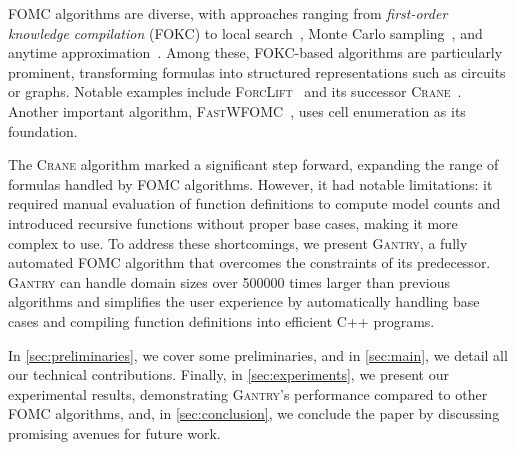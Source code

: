 \documentclass[a4paper,UKenglish,cleveref, autoref, thm-restate]{lipics-v2021}
\newcommand{\Cranetwo}{\textsc{Gantry}}
\begin{document}

FOMC algorithms are diverse, with approaches ranging from \emph{first-order
  knowledge compilation} (FOKC) to local
search~\cite{DBLP:journals/pvldb/NiuRDS11}, Monte Carlo
sampling~\cite{DBLP:journals/cacm/GogateD16}, and anytime
approximation~\cite{DBLP:conf/ijcai/BremenK20}. Among these, FOKC-based
algorithms are particularly prominent, transforming formulas into structured
representations such as circuits or graphs. Notable examples include
\textsc{ForcLift}~\cite{DBLP:conf/ijcai/BroeckTMDR11} and its successor
\textsc{Crane}~\cite{DBLP:conf/kr/DilkasB23}. Another important algorithm,
\textsc{FastWFOMC}~\cite{DBLP:conf/uai/BremenK21}, uses cell enumeration as its
foundation.


The \textsc{Crane} algorithm marked a significant step forward, expanding the
range of formulas handled by FOMC algorithms. However, it had notable
limitations: it required manual evaluation of function definitions to compute
model counts and introduced recursive functions without proper base cases,
making it more complex to use. To address these shortcomings, we present
\Cranetwo{}, a fully automated FOMC algorithm that overcomes the constraints of
its predecessor. \Cranetwo{} can handle domain sizes over \num{500000} times
larger than previous algorithms and simplifies the user experience by
automatically handling base cases and compiling function definitions into
efficient C++ programs.

In \cref{sec:preliminaries}, we cover some preliminaries, and in
\cref{sec:main}, we detail all our technical contributions. Finally, in
\cref{sec:experiments}, we present our experimental results, demonstrating
\Cranetwo{}'s performance compared to other FOMC algorithms, and, in
\cref{sec:conclusion}, we conclude the paper by discussing promising avenues for
future work.
\end{document}
